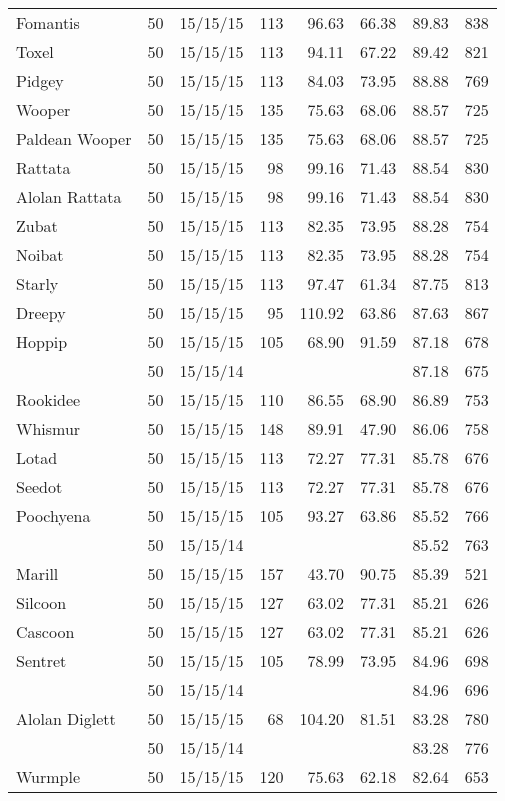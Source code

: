 \begin{longtable}{lrrrrrrr}
Fomantis & 50 & 15/15/15 & 113 & 96.63 & 66.38 & 89.83 &  838\\
Toxel & 50 & 15/15/15 & 113 & 94.11 & 67.22 & 89.42 &  821\\
Pidgey & 50 & 15/15/15 & 113 & 84.03 & 73.95 & 88.88 &  769\\
Wooper & 50 & 15/15/15 & 135 & 75.63 & 68.06 & 88.57 &  725\\
Paldean Wooper & 50 & 15/15/15 & 135 & 75.63 & 68.06 & 88.57 &  725\\
Rattata & 50 & 15/15/15 & 98 & 99.16 & 71.43 & 88.54 &  830\\
Alolan Rattata & 50 & 15/15/15 & 98 & 99.16 & 71.43 & 88.54 &  830\\
Zubat & 50 & 15/15/15 & 113 & 82.35 & 73.95 & 88.28 &  754\\
Noibat & 50 & 15/15/15 & 113 & 82.35 & 73.95 & 88.28 &  754\\
Starly & 50 & 15/15/15 & 113 & 97.47 & 61.34 & 87.75 &  813\\
Dreepy & 50 & 15/15/15 & 95 & 110.92 & 63.86 & 87.63 &  867\\
Hoppip & 50 & 15/15/15 & 105 & 68.90 & 91.59 & 87.18 &  678\\
 & 50 & 15/15/14 & & & & 87.18 &  675\\
Rookidee & 50 & 15/15/15 & 110 & 86.55 & 68.90 & 86.89 &  753\\
Whismur & 50 & 15/15/15 & 148 & 89.91 & 47.90 & 86.06 &  758\\
Lotad & 50 & 15/15/15 & 113 & 72.27 & 77.31 & 85.78 &  676\\
Seedot & 50 & 15/15/15 & 113 & 72.27 & 77.31 & 85.78 &  676\\
Poochyena & 50 & 15/15/15 & 105 & 93.27 & 63.86 & 85.52 &  766\\
 & 50 & 15/15/14 & & & & 85.52 &  763\\
Marill & 50 & 15/15/15 & 157 & 43.70 & 90.75 & 85.39 &  521\\
Silcoon & 50 & 15/15/15 & 127 & 63.02 & 77.31 & 85.21 &  626\\
Cascoon & 50 & 15/15/15 & 127 & 63.02 & 77.31 & 85.21 &  626\\
Sentret & 50 & 15/15/15 & 105 & 78.99 & 73.95 & 84.96 &  698\\
 & 50 & 15/15/14 & & & & 84.96 &  696\\
Alolan Diglett & 50 & 15/15/15 & 68 & 104.20 & 81.51 & 83.28 &  780\\
 & 50 & 15/15/14 & & & & 83.28 &  776\\
Wurmple & 50 & 15/15/15 & 120 & 75.63 & 62.18 & 82.64 &  653\\

\end{longtable}
